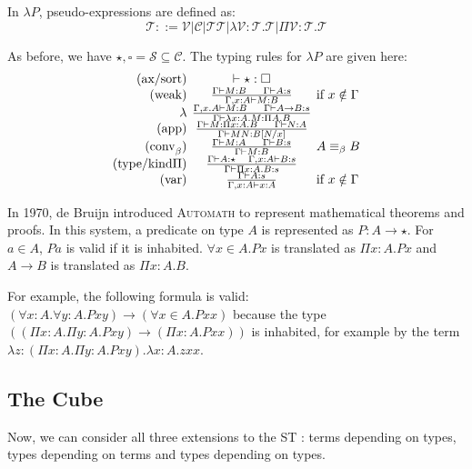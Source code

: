 In $\lambda P$, pseudo-expressions are defined as:
\[
\mathcal{T} ::= \mathcal{V} | \mathcal{C} | \mathcal{TT} | \lambda \mathcal{V} : \mathcal{T. T} | \Pi \mathcal{V: T. T}
\]

As before, we have ${\star, \square} = \mathcal{S} \subseteq \mathcal{C}$. The typing rules for $\lambda P$ are given here:
\begin{equation}
\begin{array}{r@{\hspace{0.4em}}c@{\hspace{0.4em}}l}
\text{(ax/sort)}&\vdash \star : \square& \\
\text{(weak)}&\frac{\Gamma \vdash M : B~~~~\Gamma \vdash A : s}{\Gamma, x: A \vdash M : B}& \text{if } x \notin \Gamma \\
\lambda&\frac{\Gamma, x. A \vdash M : B~~~~\Gamma \vdash A \to B : s}{\Gamma \vdash \lambda x: A. M : \Pi A. B}& \\
\text{(app)}&\frac{\Gamma \vdash M : \Pi x: A. B~~~~\Gamma \vdash N : A}{\Gamma \vdash MN : B[N/x]}&\\
\text{(conv}_\beta\text{)}&\frac{\Gamma \vdash M : A~~~~\Gamma \vdash B : s}{\Gamma \vdash M : B}&A \equiv_\beta B \\
\text{(type/kind} \Pi \text{)}&\frac{\Gamma \vdash A : \star~~~\Gamma, x: A \vdash B : s}{\Gamma \vdash \Pi x : A. B : s}&\\
\text{(var)}&\frac{\Gamma \vdash A : s}{\Gamma, x: A \vdash x : A}&\text{if } x \notin \Gamma
\end{array}
\end{equation}

In 1970, de Bruijn introduced \textsc{Automath} to represent mathematical theorems and proofs. In this system,
a predicate on type $A$ is represented as $P : A \to \star$. For $a \in A$, $P a$ is valid if it is inhabited.
$\forall x\in A. Px$ is translated as $\Pi x: A. Px$ and $A \to B$ is translated as $\Pi x: A. B$.

For example, the following formula is valid: $(\forall x: A. \forall y: A. Pxy) \to (\forall x\in A. Pxx)$ because 
the type $((\Pi x: A. \Pi y: A. Pxy) \to (\Pi x: A. P x x))$ is inhabited, for example by the 
term $\lambda z: (\Pi x: A. \Pi y: A. P xy). \lambda x: A. z x x$.

\subsection{The Cube}
Now, we can consider all three extensions to the ST \lc: terms depending on types, types depending on terms and types
depending on types.


